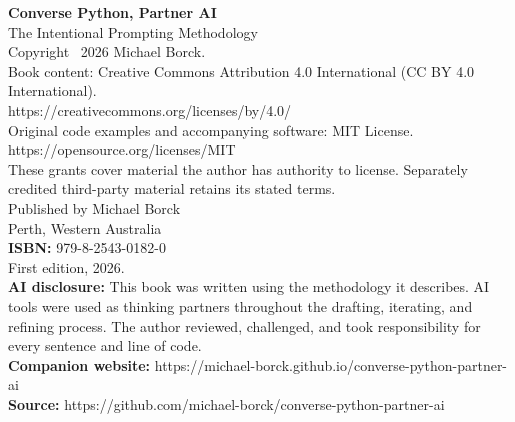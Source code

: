 \thispagestyle{empty}
\vspace*{\fill}

\begin{flushleft}
\textbf{Converse Python, Partner AI}\\
The Intentional Prompting Methodology\\[1.5em]
Copyright \textcopyright\ 2026 Michael Borck.\\[1em]
Book content: Creative Commons Attribution 4.0 International (CC BY 4.0 International).\\
https://creativecommons.org/licenses/by/4.0/\\[0.5em]
Original code examples and accompanying software: MIT License.\\
https://opensource.org/licenses/MIT\\[0.5em]
These grants cover material the author has authority to license. Separately credited third-party material retains its stated terms.\\[1em]
Published by Michael Borck\\
Perth, Western Australia\\[1em]
\textbf{ISBN:} 979-8-2543-0182-0\\[1em]
First edition, 2026.\\[1em]
\textbf{AI disclosure:} This book was written using the methodology it describes. AI tools were used as thinking partners throughout the drafting, iterating, and refining process. The author reviewed, challenged, and took responsibility for every sentence and line of code.\\[1em]
\textbf{Companion website:} https://michael-borck.github.io/converse-python-partner-ai\\
\textbf{Source:} https://github.com/michael-borck/converse-python-partner-ai
\end{flushleft}

\vspace*{\fill}
\clearpage
